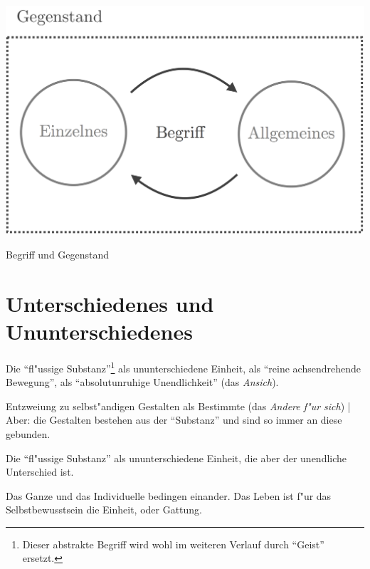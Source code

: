 \documentclass[a4paper, justified]{tufte-handout}
\begin{document}
\begin{marginfigure}%
  \includegraphics[width=\linewidth]{begriff}
  \caption{Begriff und Gegenstand}
  \label{fig:begriff}
\end{marginfigure}


\section{Unterschiedenes und Ununterschiedenes}\label{sec:leben}

\begin{description}[leftmargin=!,labelwidth=\widthof{\bfseries Neg. d. Neg}]
  \item[Meinen] Die "`fl"ussige Substanz"'\footnote{Dieser abstrakte Begriff wird wohl im weiteren Verlauf durch "`Geist"' ersetzt.} als ununterschiedene Einheit, als "`reine achsendrehende Bewegung"', als "`absolutunruhige Unendlichkeit"' (das \emph{Ansich}).
  \item[Negation] Entzweiung zu selbst"andigen Gestalten als Bestimmte  (das \emph{Andere f"ur sich}) | Aber: die Gestalten bestehen aus der "`Substanz"' und sind so immer an diese gebunden.
  \item[Neg. d. Neg.] Die "`fl"ussige Substanz"' als ununterschiedene Einheit, die aber der unendliche Unterschied ist.
  \item[Erkenntnis] Das Ganze und das Individuelle bedingen einander. Das Leben ist f"ur das Selbstbewusstsein die Einheit, oder Gattung.
\end{description}
\end{document}
